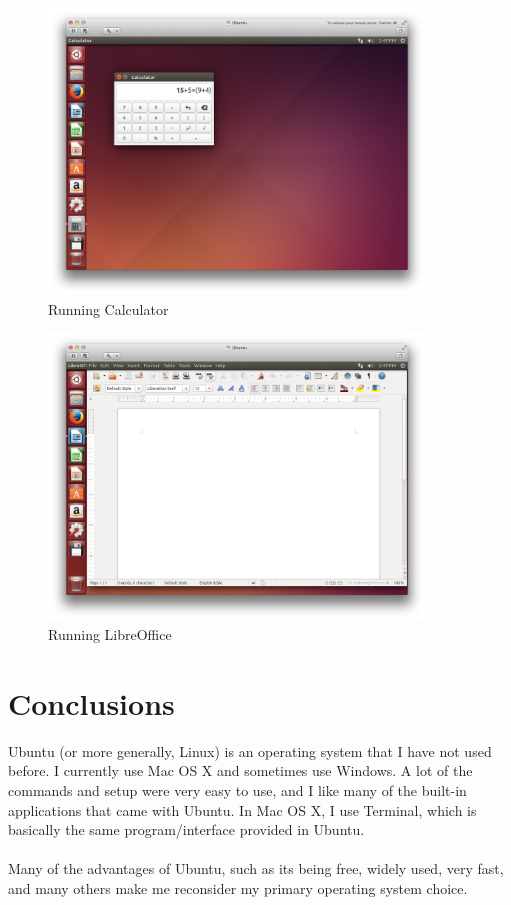 \documentclass[12pt]{article}
\newcommand{\imagesize}{100mm}
\begin{document}
\begin{figure}
\centering
\includegraphics[width=\imagesize]{13.jpg}
\caption{Running Calculator}
\end{figure}

\begin{figure}
\centering
\includegraphics[width=\imagesize]{14.jpg}
\caption{Running LibreOffice}
\end{figure}

\newpage

\section{Conclusions}
Ubuntu (or more generally, Linux) is an operating system that I have not used before. I currently use Mac OS X and sometimes use Windows. A lot of the commands and setup were very easy to use, and I like many of the built-in applications that came with Ubuntu. In Mac OS X, I use Terminal, which is basically the same program/interface provided in Ubuntu.
\\ \\
Many of the advantages of Ubuntu, such as its being free, widely used, very fast, and many others make me reconsider my primary operating system choice. 
\end{document}
